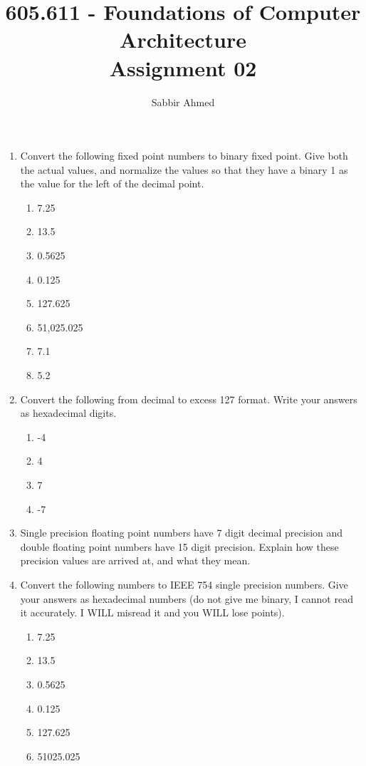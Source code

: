 \documentclass[12pt]{article}
\begin{document}
  \title{605.611 - Foundations of Computer Architecture \\ Assignment 02\vspace{-0.5em}}
  \author{Sabbir Ahmed}
  \maketitle
  \vspace{-1em}

  \begin{enumerate}

    \item Convert the following fixed point numbers to binary fixed point. Give both the actual values, and normalize the values so that they have a binary 1 as the value for the left of the decimal point.
    \begin{enumerate}
      \item 7.25
      \item 13.5
      \item 0.5625
      \item 0.125
      \item 127.625
      \item 51,025.025
      \item 7.1
      \item 5.2
    \end{enumerate}

    \setcounter{enumi}{4}
    \item Convert the following from decimal to excess 127 format. Write your answers as hexadecimal digits.
    \begin{enumerate}
      \item -4

      \item 4

      \setcounter{enumii}{3}
      \item 7

      \item -7

    \end{enumerate}

    \setcounter{enumi}{7}
    \item Single precision floating point numbers have 7 digit decimal precision and double floating point numbers have 15 digit precision. Explain how these precision values are arrived at, and what they mean.

    \item Convert the following numbers to IEEE 754 single precision numbers. Give your answers as hexadecimal numbers (do not give me binary, I cannot read it accurately. I WILL misread it and you WILL lose points).
    \begin{enumerate}
      \item 7.25
      \item 13.5
      \item 0.5625
      \item 0.125
      \item 127.625
      \item 51025.025
    \end{enumerate}


\end{enumerate}
\end{document}
